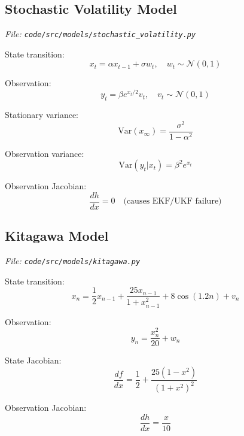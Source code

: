 \documentclass[12pt]{article}
\begin{document}
\subsection{Stochastic Volatility Model}
\textit{File: \texttt{code/src/models/stochastic\_volatility.py}}

State transition:
\begin{equation}
x_t = \alpha x_{t-1} + \sigma w_t, \quad w_t \sim \mathcal{N}(0, 1)
\end{equation}

Observation:
\begin{equation}
y_t = \beta e^{x_t/2} v_t, \quad v_t \sim \mathcal{N}(0, 1)
\end{equation}

Stationary variance:
\begin{equation}
\text{Var}(x_\infty) = \frac{\sigma^2}{1 - \alpha^2}
\end{equation}

Observation variance:
\begin{equation}
\text{Var}(y_t | x_t) = \beta^2 e^{x_t}
\end{equation}

Observation Jacobian:
\begin{equation}
\frac{dh}{dx} = 0 \quad \text{(causes EKF/UKF failure)}
\end{equation}

\subsection{Kitagawa Model}
\textit{File: \texttt{code/src/models/kitagawa.py}}

State transition:
\begin{equation}
x_n = \frac{1}{2}x_{n-1} + \frac{25x_{n-1}}{1 + x_{n-1}^2} + 8\cos(1.2n) + v_n
\end{equation}

Observation:
\begin{equation}
y_n = \frac{x_n^2}{20} + w_n
\end{equation}

State Jacobian:
\begin{equation}
\frac{df}{dx} = \frac{1}{2} + \frac{25(1 - x^2)}{(1 + x^2)^2}
\end{equation}

Observation Jacobian:
\begin{equation}
\frac{dh}{dx} = \frac{x}{10}
\end{equation}
\end{document}
